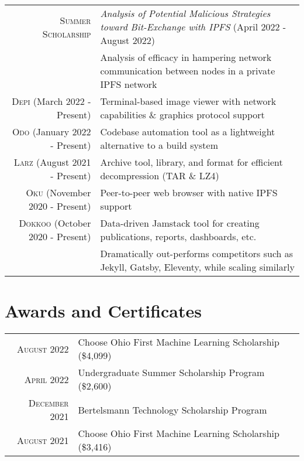 \documentclass[letterpaper,8pt]{article} %
\begin{document}
\begin{tabular}{rl}
\footnotesize\textsc{Summer Scholarship} & \footnotesize\emph{Analysis of Potential Malicious Strategies toward Bit-Exchange with IPFS} \footnotesize{(April 2022 - August 2022)}\\
& \footnotesize{Analysis of efficacy in hampering network communication between nodes in a private IPFS network}\\
\textsc{Depi} \footnotesize{(March 2022 - Present)} & \footnotesize{Terminal-based image viewer with network capabilities \& graphics protocol support}\\
\textsc{Odo} \footnotesize{(January 2022 - Present)} & \footnotesize{Codebase automation tool as a lightweight alternative to a build system}\\
\textsc{Larz} \footnotesize{(August 2021 - Present)} & \footnotesize{Archive tool, library, and format for efficient decompression (TAR \& LZ4)}\\
\textsc{Oku} \footnotesize{(November 2020 - Present)} & \footnotesize{Peer-to-peer web browser with native IPFS support}\\
\textsc{Dokkoo} \footnotesize{(October 2020 - Present)} & \footnotesize{Data-driven Jamstack tool for creating publications, reports, dashboards, etc.}\\
& \footnotesize{Dramatically out-performs competitors such as Jekyll, Gatsby, Eleventy, while scaling similarly}
\end{tabular}


\section{Awards and Certificates}

\footnotesize{\begin{tabular}{rl}
\textsc{August 2022} & Choose Ohio First Machine Learning Scholarship \footnotesize(\$4,099)\normalsize\\
\textsc{April 2022} & Undergraduate Summer Scholarship Program \footnotesize(\$2,600)\\
\textsc{December 2021} & Bertelsmann Technology Scholarship Program\\
\textsc{August 2021} & Choose Ohio First Machine Learning Scholarship \footnotesize(\$3,416)\normalsize\\
\end{tabular}}\normalsize
\end{document}
